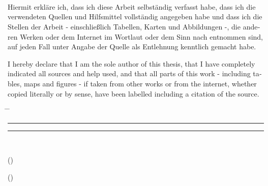 \chapter*{\declarationlabel}

\tuinfthesisauthor\\
\tuinfthesisauthoraddress

\vspace*{1.2cm}

\begin{otherlanguage}{ngerman}
  Hiermit erkläre ich, dass ich diese Arbeit selbständig verfasst habe, dass ich die verwendeten Quellen und Hilfsmittel vollständig angegeben habe und dass ich die Stellen der Arbeit - einschließlich Tabellen, Karten und Abbildungen -, die anderen Werken oder dem Internet im Wortlaut oder dem Sinn nach entnommen sind, auf jeden Fall unter Angabe der Quelle als Entlehnung kenntlich gemacht habe.\\
\end{otherlanguage}

\vspace*{1cm}

\begin{otherlanguage}{english}
  I hereby declare that I am the sole author of this thesis, that I have completely indicated all sources and help used, and that all parts of this work - including tables, maps and figures - if taken from other works or from the internet, whether copied literally or by sense, have been labelled including a citation of the source.
\end{otherlanguage}

\vspace*{2cm}
\begin{tabbing}%
    \hspace{58mm} \= \hspace{28mm} \= \hspace{58mm} \kill
    {\raggedright\rule{58mm}{0.5pt}} \> \> {\raggedright\rule{58mm}{0.5pt}} \\
    \begin{minipage}[t][0.5cm][t]{58mm}
	\vspace{0pt}\sffamily\thesistitlefontnormalsize
	\centering ()
    \end{minipage}
    \> \>
    \begin{minipage}[t][0.5cm][t]{58mm}
	\vspace{0pt}\sffamily\thesistitlefontnormalsize
	\centering ()
    \end{minipage}
\end{tabbing}


